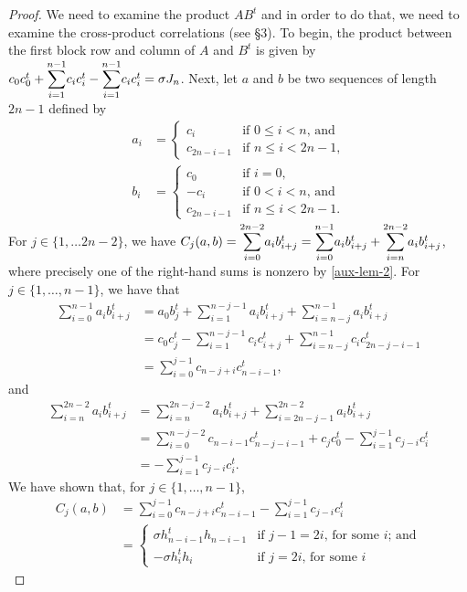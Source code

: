 \documentclass[../../../main]{subfiles}
\begin{document}
\begin{proof}
  We need to examine the product $AB^t$ and in order to do that, we need to examine the cross-product correlations (see \S3). To begin, the product between the first block row and column of $A$ and $B^t$ is given by $c_0c_0^t + \ssum_{i=1}^{n-1}c_ic_i^t - \ssum_{i=1}^{n-1}c_ic_i^t = \sigma J_n$. Next, let $a$ and $b$ be two sequences of length $2n-1$ defined by 
  \begin{align*}
  a_i&=\begin{cases}
        c_i & \text{if $0 \leq i < n$, and} \\
        c_{2n-i-1} & \text{if $n \leq i < 2n-1$,}
       \end{cases} \\
  b_i&=\begin{cases}
        c_0 & \text{if $i=0$,} \\
        -c_i & \text{if $0 < i < n$, and} \\
        c_{2n-i-1} & \text{if $n \leq i < 2n-1$.}
       \end{cases}
  \end{align*}
  For $j \in \{1, \dots 2n-2\}$, we have $C_j(a,b) = \ssum_{i=0}^{2n-2}a_ib_{i+j}^t = \ssum_{i=0}^{n-1}a_ib_{i+j}^t + \ssum_{i=n}^{2n-2}a_ib_{i+j}^t$, where precisely one of the right-hand sums is nonzero by \ref{aux-lem-2}. For $j \in \{1, \dots, n-1\}$, we have that
  \begin{align*}
   \sum_{i=0}^{n-1}a_ib_{i+j}^t &= a_0b_j^t + \sum_{i=1}^{n-j-1}a_ib_{i+j}^t + \sum_{i=n-j}^{n-1}a_ib_{i+j}^t \\
   &= c_0c_j^t - \sum_{i=1}^{n-j-1} c_ic_{i+j}^t + \sum_{i=n-j}^{n-1}c_ic_{2n-j-i-1}^t \\
   &= \sum_{i=0}^{j-1}c_{n-j+i}c_{n-i-1}^t,
  \end{align*}
  and
  \begin{align*}
   \sum_{i=n}^{2n-2}a_ib_{i+j}^t &= \sum_{i=n}^{2n-j-2}a_ib_{i+j}^t + \sum_{i=2n-j-1}^{2n-2}a_ib_{i+j}^t \\
   &= \sum_{i=0}^{n-j-2}c_{n-i-1}c_{n-j-i-1}^t + c_jc_0^t - \sum_{i=1}^{j-1}c_{j-i}c_i^t \\
   &= -\sum_{i=1}^{j-1}c_{j-i}c_i^t.
  \end{align*}
  We have shown that, for $j \in \{1,\dots,n-1\}$, 
  \begin{align*}
   C_j(a,b) &= \sum_{i=0}^{j-1}c_{n-j+i}c_{n-i-1}^t - \sum_{i=1}^{j-1}c_{j-i}c_i^t \\
   &= \begin{cases}
       \sigma h_{n-i-1}^th_{n-i-1} & \text{if $j-1=2i$, for some $i$; and} \\
       -\sigma h_i^th_i & \text{if $j=2i$, for some $i$}
      \end{cases}
  \end{align*}
  

\end{proof}
\end{document}
